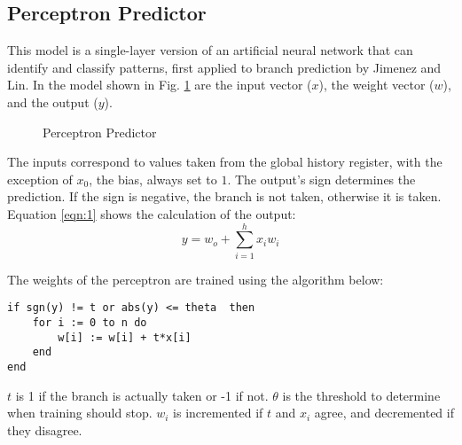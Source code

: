 \documentclass[conference]{IEEEtran}
\begin{document}
\subsection{Perceptron Predictor} \label{ssec:perceptron}
This model is a single-layer version of an artificial neural network that can identify and classify patterns, first applied to branch prediction by Jimenez and Lin\cite{jimenez2001dynamic}. In the model shown in Fig. \ref{fig:perceptron} are the input vector ($x$), the weight vector ($w$), and the output ($y$).
\begin{figure}
    \centering
    \caption{Perceptron Predictor}
	\label{fig:perceptron}
\end{figure}
The inputs correspond to values taken from the global history register, with the exception of $x_0$, the bias, always set to $1$. The output's sign determines the prediction. If the sign is negative, the branch is not taken, otherwise it is taken. Equation \eqref{eqn:1} shows the calculation of the output:
\begin{equation}
    y = w_o + \sum_{i=1}^{h}{x_iw_i}
    \label{eqn:1}
\end{equation}

The weights of the perceptron are trained using the algorithm below:
\begin{lstlisting}
if sgn(y) != t or abs(y) <= theta  then
    for i := 0 to n do
        w[i] := w[i] + t*x[i]
    end
end
\end{lstlisting}
$t$ is 1 if the branch is actually taken or -1 if not. $\theta$ is the threshold to determine when training should stop. $w_i$ is incremented if $t$ and $x_i$ agree, and decremented if they disagree.
\end{document}
